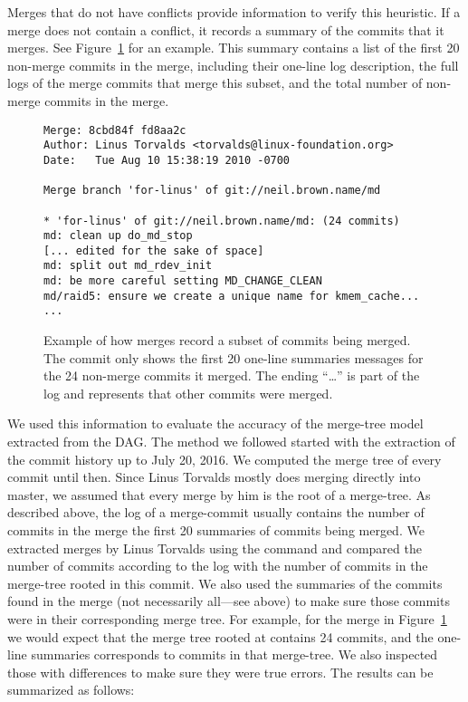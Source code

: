 Merges that do not have conflicts provide information to verify this
heuristic. If a merge does not contain a conflict, it records a summary
of the commits that it merges. See Figure~\ref{fig:sampleMerge} for an
example. This summary contains a list of the first 20 non-merge commits
in the merge, including their one-line log description, the full logs of
the merge commits that merge this subset, and the total number of
non-merge commits in the merge.

\begin{figure}[htbp]
        \centering
        {\fontsize{7}{9}
        \begin{verbatim}
Merge: 8cbd84f fd8aa2c
Author: Linus Torvalds <torvalds@linux-foundation.org>
Date:   Tue Aug 10 15:38:19 2010 -0700

Merge branch 'for-linus' of git://neil.brown.name/md

* 'for-linus' of git://neil.brown.name/md: (24 commits)
md: clean up do_md_stop
[... edited for the sake of space]
md: split out md_rdev_init
md: be more careful setting MD_CHANGE_CLEAN
md/raid5: ensure we create a unique name for kmem_cache...
...
        \end{verbatim}}\vspace{-5mm}
        \caption{Example of how merges record a subset of commits being merged. The
                commit only shows the first 20 one-line summaries messages for the 24
                non-merge commits it merged. The ending ``\ldots'' is part of the log
                and represents that other commits were merged.}
        \label{fig:sampleMerge}
\end{figure}

We used this information to evaluate the accuracy of the merge-tree
model extracted from the DAG\@. The method we followed started with the
extraction of the commit history up to July 20, 2016. We computed the
merge tree of every commit until then. Since Linus Torvalds mostly does
merging directly into master, we assumed that every merge by him is the
root of a merge-tree. As described above, the log of a merge-commit
usually contains the number of commits in the merge the first 20
summaries of commits being merged. We extracted merges by Linus Torvalds
using the command  and compared
the number of commits according to the log with the number of commits in
the  merge-tree rooted in this commit. We also used the summaries of the
commits found in the merge (not necessarily all---see above) to make
sure those commits were in their corresponding merge tree. For example,
for the merge in Figure~\ref{fig:sampleMerge} we would expect that the
merge tree rooted at  contains 24 commits, and the
one-line summaries corresponds to commits in that merge-tree. We also
inspected those with differences to make sure they were true errors.
The results can be summarized as follows:


